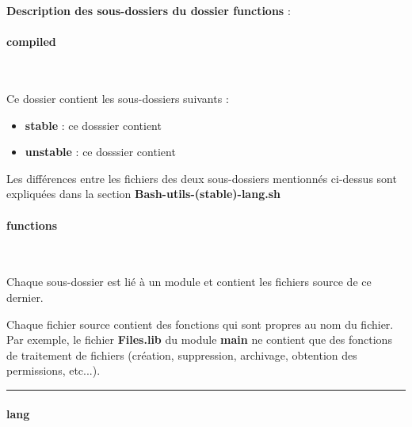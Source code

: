 \documentclass[a4paper,10pt]{article}
\begin{document}
\textbf{Description des sous-dossiers du dossier \textbf{functions}} :

\setcounter{secnumdepth}{4}

\paragraph{compiled}\mbox{}\\\mbox{}

Ce dossier contient les sous-dossiers suivants :

\begin{justify}
    \begin{itemize}
        \item \textbf{\color{path}stable} : ce dosssier contient\\\mbox{}

        \item \textbf{\color{path}unstable} : ce dosssier contient
    \end{itemize}
\end{justify}

\begin{justify}
    Les différences entre les fichiers des deux sous-dossiers mentionnés ci-dessus sont expliquées dans la section \textbf{\color{sec2}Bash-utils-(stable)-lang.sh\color{text}}
\end{justify}

\paragraph{functions}\mbox{}\\\mbox{}

Chaque sous-dossier est lié à un module et contient les fichiers source de ce dernier.

\begin{justify}
    Chaque fichier source contient des fonctions qui sont propres au nom du fichier. Par exemple, le fichier \textbf{\color{path}Files.lib} du module \textbf{main} ne contient que des fonctions de traitement de fichiers (création, suppression, archivage, obtention des permissions, etc...).
\end{justify}


\par\noindent\rule{\textwidth}{0.4pt}

\paragraph{lang}\mbox{}\\\mbox{}
\end{document}
